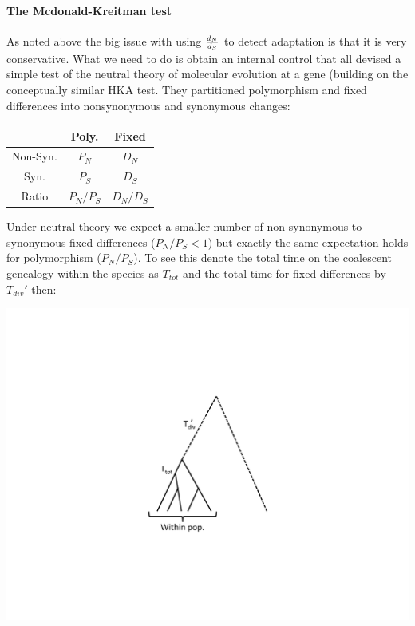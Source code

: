 \paragraph{The Mcdonald-Kreitman test}
As noted above the big issue with using $\frac{d_N}{d_S}$ to detect adaptation is that it is very conservative. What we need to do is obtain an internal control that all
\citet{mcdonald:91} devised a simple test of the neutral theory of molecular
evolution at a gene (building on the conceptually similar HKA
test\cite{HKA}. They partitioned polymorphism and fixed differences into 
nonsynonymous and synonymous changes:
\begin{center}
\begin{tabular}{ccc}
 & Poly. & Fixed \\
\hline 
Non-Syn. &    $P_N$  &   $D_N$  \\
Syn. &    $P_S$   &     $D_S$   \\
Ratio & $P_N/P_S$ & $D_N/D_S$
\end{tabular}
\end{center}

Under neutral theory we expect a smaller number of non-synonymous to
synonymous fixed differences ($P_N/P_S < 1$) but exactly the same
expectation holds for polymorphism
($P_N/P_S$). To see this denote the total time on the coalescent genealogy within the species as
$T_{tot}$ and the total time for fixed differences by $T_{div}'$ then:

\begin{marginfigure}
\begin{center}
\includegraphics[width=0.8 \textwidth]{figures/Coalescent/MK_tree.pdf}
\end{center}
\caption{ } \label{fig:MK_tree}
\end{marginfigure}

